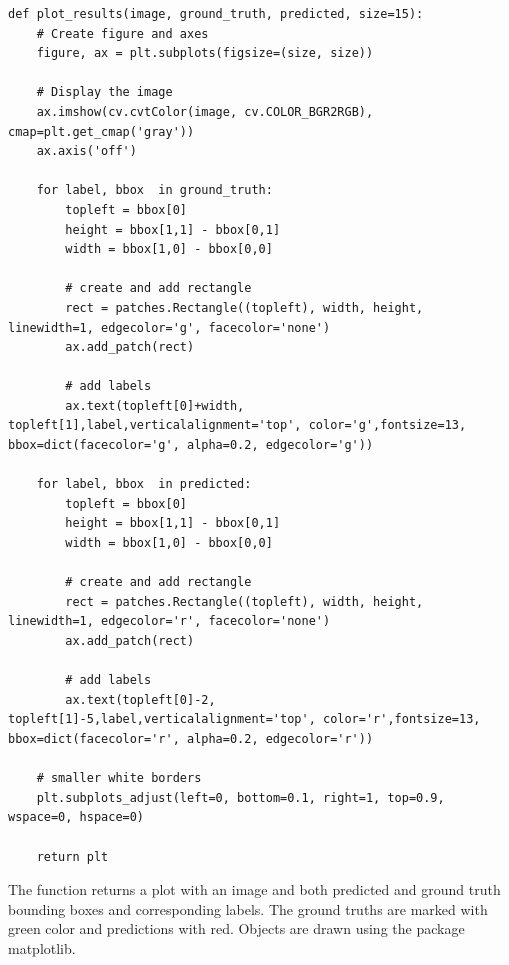 \begin{lstlisting}[caption=plot\_results]
def plot_results(image, ground_truth, predicted, size=15):
    # Create figure and axes
    figure, ax = plt.subplots(figsize=(size, size))

    # Display the image
    ax.imshow(cv.cvtColor(image, cv.COLOR_BGR2RGB), cmap=plt.get_cmap('gray'))
    ax.axis('off')

    for label, bbox  in ground_truth:
        topleft = bbox[0]
        height = bbox[1,1] - bbox[0,1]
        width = bbox[1,0] - bbox[0,0]

        # create and add rectangle
        rect = patches.Rectangle((topleft), width, height, linewidth=1, edgecolor='g', facecolor='none')
        ax.add_patch(rect)

        # add labels
        ax.text(topleft[0]+width, topleft[1],label,verticalalignment='top', color='g',fontsize=13, bbox=dict(facecolor='g', alpha=0.2, edgecolor='g'))

    for label, bbox  in predicted:
        topleft = bbox[0]
        height = bbox[1,1] - bbox[0,1]
        width = bbox[1,0] - bbox[0,0]

        # create and add rectangle
        rect = patches.Rectangle((topleft), width, height, linewidth=1, edgecolor='r', facecolor='none')
        ax.add_patch(rect)

        # add labels
        ax.text(topleft[0]-2, topleft[1]-5,label,verticalalignment='top', color='r',fontsize=13, bbox=dict(facecolor='r', alpha=0.2, edgecolor='r'))
    
    # smaller white borders
    plt.subplots_adjust(left=0, bottom=0.1, right=1, top=0.9, wspace=0, hspace=0)

    return plt 
\end{lstlisting}

The function  returns a plot with an image and both predicted and ground truth bounding boxes 
and corresponding labels. The ground truths are marked with green color and predictions with red. Objects are drawn using the package matplotlib.

